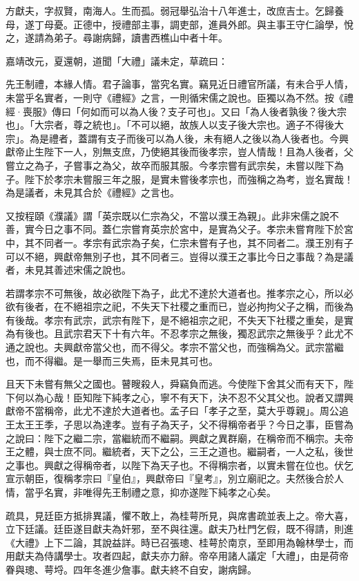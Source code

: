\begin{pinyinscope}
方獻夫，字叔賢，南海人。生而孤。弱冠舉弘治十八年進士，改庶吉士。乞歸養母，遂丁母憂。正德中，授禮部主事，調吏部，進員外郎。與主事王守仁論學，悅之，遂請為弟子。尋謝病歸，讀書西樵山中者十年。

嘉靖改元，夏還朝，道聞「大禮」議未定，草疏曰：

先王制禮，本緣人情。君子論事，當究名實。竊見近日禮官所議，有未合乎人情，未當乎名實者，一則守《禮經》之言，一則循宋儒之說也。臣獨以為不然。按《禮經·喪服》傳曰「何如而可以為人後？支子可也」。又曰「為人後者孰後？後大宗也」。「大宗者，尊之統也」。「不可以絕，故族人以支子後大宗也。適子不得後大宗」。為是禮者，蓋謂有支子而後可以為人後，未有絕人之後以為人後者也。今興獻帝止生陛下一人，別無支庶，乃使絕其後而後孝宗，豈人情哉！且為人後者，父嘗立之為子，子嘗事之為父，故卒而服其服。今孝宗嘗有武宗矣，未嘗以陛下為子。陛下於孝宗未嘗服三年之服，是實未嘗後孝宗也，而強稱之為考，豈名實哉！為是議者，未見其合於《禮經》之言也。

又按程頤《濮議》謂「英宗既以仁宗為父，不當以濮王為親」。此非宋儒之說不善，實今日之事不同。蓋仁宗嘗育英宗於宮中，是實為父子。孝宗未嘗育陛下於宮中，其不同者一。孝宗有武宗為子矣，仁宗未嘗有子也，其不同者二。濮王別有子可以不絕，興獻帝無別子也，其不同者三。豈得以濮王之事比今日之事哉？為是議者，未見其善述宋儒之說也。

若謂孝宗不可無後，故必欲陛下為子，此尤不達於大道者也。推孝宗之心，所以必欲有後者，在不絕祖宗之祀，不失天下社稷之重而已，豈必拘拘父子之稱，而後為有後哉。孝宗有武宗，武宗有陛下，是不絕祖宗之祀，不失天下社稷之重矣，是實為有後也。且武宗君天下十有六年。不忍孝宗之無後，獨忍武宗之無後乎？此尤不通之說也。夫興獻帝當父也，而不得父。孝宗不當父也，而強稱為父。武宗當繼也，而不得繼。是一舉而三失焉，臣未見其可也。

且天下未嘗有無父之國也。瞽瞍殺人，舜竊負而逃。今使陛下舍其父而有天下，陛下何以為心哉！臣知陛下純孝之心，寧不有天下，決不忍不父其父也。說者又謂興獻帝不當稱帝，此尤不達於大道者也。孟子曰「孝子之至，莫大乎尊親」。周公追王太王王季，子思以為達孝。豈有子為天子，父不得稱帝者乎？今日之事，臣嘗為之說曰：陛下之繼二宗，當繼統而不繼嗣。興獻之異群廟，在稱帝而不稱宗。夫帝王之體，與士庶不同。繼統者，天下之公，三王之道也。繼嗣者，一人之私，後世之事也。興獻之得稱帝者，以陛下為天子也。不得稱宗者，以實未嘗在位也。伏乞宣示朝臣，復稱孝宗曰『皇伯』，興獻帝曰『皇考』，別立廟祀之。夫然後合於人情，當乎名實，非唯得先王制禮之意，抑亦遂陛下純孝之心矣。

疏具，見廷臣方抵排異議，懼不敢上，為桂萼所見，與席書疏並表上之。帝大喜，立下廷議。廷臣遂目獻夫為奸邪，至不與往還。獻夫乃杜門乞假，既不得請，則進《大禮》上下二論，其說益詳。時已召張璁、桂萼於南京，至即用為翰林學士，而用獻夫為侍講學士。攻者四起，獻夫亦力辭。帝卒用諸人議定「大禮」，由是荷帝眷與璁、萼埒。四年冬進少詹事。獻夫終不自安，謝病歸。


\end{pinyinscope}
